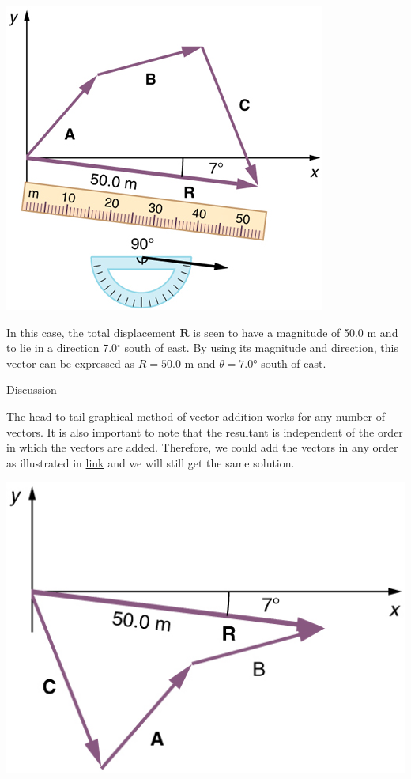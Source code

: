 \documentclass[
]{book}
\newenvironment{tinysection}{}{}
\begin{document}
\includegraphics{images/Figure_03_02_11a.jpg}

In this case, the total displacement \(\textbf{R}{}\) is seen to have a
magnitude of 50.0 m and to lie in a direction \(7.0{^\circ}{}\) south of
east. By using its magnitude and direction, this vector can be expressed
as \({R = \text{50.0\ m}}{}\) and \({{\theta = 7}\text{.}\text{0°}}{}\)
south of east.

\begin{tinysection}

{Discussion}

\end{tinysection}

The head-to-tail graphical method of vector addition works for any
number of vectors. It is also important to note that the resultant is
independent of the order in which the vectors are added. Therefore, we
could add the vectors in any order as illustrated in
\protect\hyperlink{import-auto-id1165298931858}{link} and we will
still get the same solution.

\includegraphics{images/Figure_03_02_12.jpg}
\end{document}
